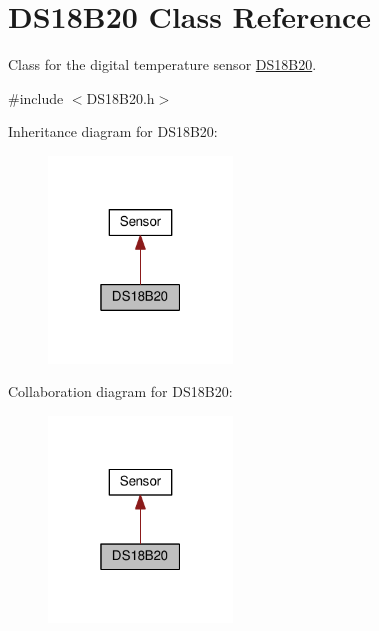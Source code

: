 \hypertarget{classDS18B20}{}\section{D\+S18\+B20 Class Reference}
\label{classDS18B20}


Class for the digital temperature sensor \mbox{\hyperlink{classDS18B20}{D\+S18\+B20}}.  




{\ttfamily \#include $<$D\+S18\+B20.\+h$>$}



Inheritance diagram for D\+S18\+B20\+:\nopagebreak
\begin{figure}[H]
\begin{center}
\leavevmode
\includegraphics[width=139pt]{classDS18B20__inherit__graph}
\end{center}
\end{figure}


Collaboration diagram for D\+S18\+B20\+:\nopagebreak
\begin{figure}[H]
\begin{center}
\leavevmode
\includegraphics[width=139pt]{classDS18B20__coll__graph}
\end{center}
\end{figure}
